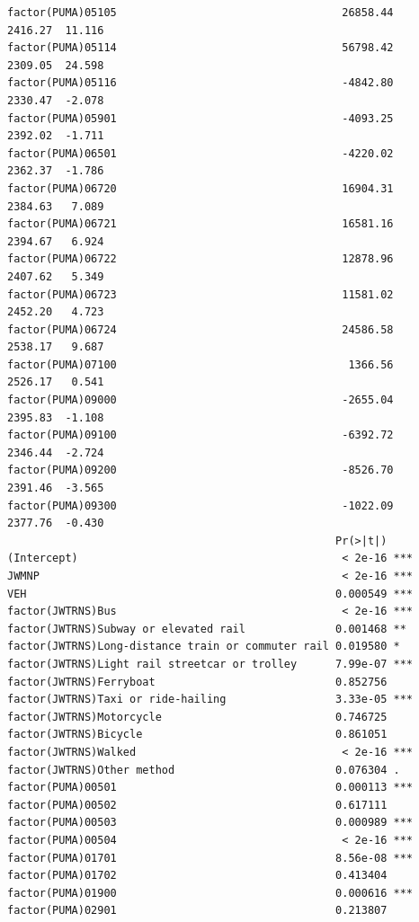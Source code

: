 \documentclass[
  letterpaper,
  DIV=11,
  numbers=noendperiod]{scrartcl}
\begin{document}
\begin{verbatim}
factor(PUMA)05105                                   26858.44    2416.27  11.116
factor(PUMA)05114                                   56798.42    2309.05  24.598
factor(PUMA)05116                                   -4842.80    2330.47  -2.078
factor(PUMA)05901                                   -4093.25    2392.02  -1.711
factor(PUMA)06501                                   -4220.02    2362.37  -1.786
factor(PUMA)06720                                   16904.31    2384.63   7.089
factor(PUMA)06721                                   16581.16    2394.67   6.924
factor(PUMA)06722                                   12878.96    2407.62   5.349
factor(PUMA)06723                                   11581.02    2452.20   4.723
factor(PUMA)06724                                   24586.58    2538.17   9.687
factor(PUMA)07100                                    1366.56    2526.17   0.541
factor(PUMA)09000                                   -2655.04    2395.83  -1.108
factor(PUMA)09100                                   -6392.72    2346.44  -2.724
factor(PUMA)09200                                   -8526.70    2391.46  -3.565
factor(PUMA)09300                                   -1022.09    2377.76  -0.430
                                                   Pr(>|t|)    
(Intercept)                                         < 2e-16 ***
JWMNP                                               < 2e-16 ***
VEH                                                0.000549 ***
factor(JWTRNS)Bus                                   < 2e-16 ***
factor(JWTRNS)Subway or elevated rail              0.001468 ** 
factor(JWTRNS)Long-distance train or commuter rail 0.019580 *  
factor(JWTRNS)Light rail streetcar or trolley      7.99e-07 ***
factor(JWTRNS)Ferryboat                            0.852756    
factor(JWTRNS)Taxi or ride-hailing                 3.33e-05 ***
factor(JWTRNS)Motorcycle                           0.746725    
factor(JWTRNS)Bicycle                              0.861051    
factor(JWTRNS)Walked                                < 2e-16 ***
factor(JWTRNS)Other method                         0.076304 .  
factor(PUMA)00501                                  0.000113 ***
factor(PUMA)00502                                  0.617111    
factor(PUMA)00503                                  0.000989 ***
factor(PUMA)00504                                   < 2e-16 ***
factor(PUMA)01701                                  8.56e-08 ***
factor(PUMA)01702                                  0.413404    
factor(PUMA)01900                                  0.000616 ***
factor(PUMA)02901                                  0.213807    

\end{verbatim}
\end{document}
